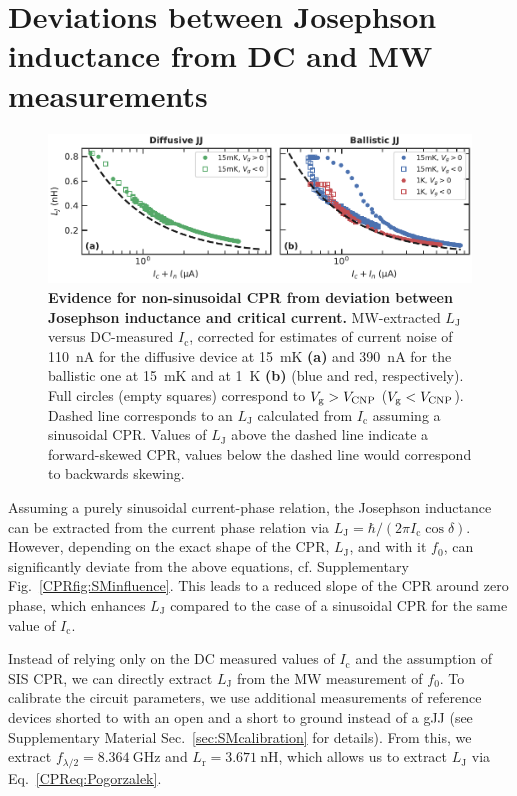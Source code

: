 \section{Deviations between Josephson inductance from DC and MW measurements}

\begin{figure}[t]
	\centering
	\includegraphics[width=\linewidth]{chapter-gJJ-CPR/figs/SMFigure2}
	\caption{
		\textbf{Evidence for non-sinusoidal CPR from deviation between Josephson inductance and critical current.}
		MW-extracted $L_\text{J}$ versus DC-measured $I_\text{c}$, corrected for estimates of current noise of \SI{110}{\nano\ampere} for the diffusive device at \SI{15}{\milli\kelvin} \textbf{(a)} and \SI{390}{\nano\ampere} for the ballistic one at \SI{15}{\milli\kelvin} and at \SI{1}{\kelvin} \textbf{(b)} (blue and red, respectively).
		Full circles (empty squares) correspond to $V_\text{g}>V_{\rm CNP}$ ($V_\text{g}<V_{\rm CNP}$).
		Dashed line corresponds to an $L_\text{J}$ calculated from $I_\text{c}$ assuming a sinusoidal CPR.
		Values of $L_\text{J}$ above the dashed line indicate a forward-skewed CPR, values below the dashed line would correspond to backwards skewing.
	}
	\label{CPRfig:figure2}
\end{figure}

Assuming a purely sinusoidal current-phase relation, the Josephson inductance can be extracted from the current phase relation via $L_\text{J} = \hbar/(2\pi I_\text{c} \cos\delta)$.
%
However, depending on the exact shape of the CPR, $L_\text{J}$, and with it $f_0$, can significantly deviate from the above equations, cf. Supplementary Fig.~\ref{CPRfig:SMinfluence}.
%
This leads to a reduced slope of the CPR around zero phase, which enhances $L_\text{J}$ compared to the case of a sinusoidal CPR for the same value of $I_\text{c}$.

Instead of relying only on the DC measured values of $I_\text{c}$ and the assumption of SIS CPR, we can directly extract $L_\text{J}$ from the MW measurement of $f_0$.
%
To calibrate the circuit parameters, we use additional measurements of reference devices shorted to with an open and a short to ground instead of a gJJ (see Supplementary Material Sec.~\ref{sec:SMcalibration} for details).
%
From this, we extract $f_{\lambda/2}=\SI{8.364}{\giga\hertz}$ and $L_\text{r}=\SI{3.671}{\nano\henry}$, which allows us to extract $L_\text{J}$ via Eq.~\ref{CPReq:Pogorzalek}.

